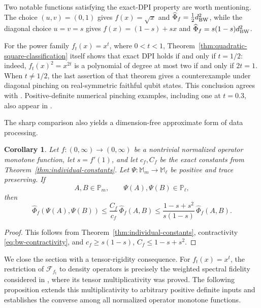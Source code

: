 \documentclass[11pt]{amsart}
\newtheorem{corollary}[theorem]{Corollary}
\theoremstyle{definition}
\theoremstyle{remark}
\newcommand{\altPhi}{\widehat{\Phi}}
\begin{document}
Two notable functions satisfying the exact-DPI property are worth
mentioning.  The
choice $(u,v)=(0,1)$ gives $f(x)=\sqrt{x}$ and
$\altPhi_f=\tfrac12d_{\rm BW}^2$, while the diagonal choice $u=v=s$
gives $f(x)=(1-s)+sx$ and
$\altPhi_f=s(1-s)d_{\rm BW}^2$.

For the power family $f_t(x)=x^t$, where $0<t<1$,
	Theorem~\ref{thm:quadratic-square-classification} itself shows that exact
	DPI holds if and only if $t=1/2$: indeed, $f_t(x)^2=x^{2t}$ is a
	polynomial of degree at most two if and only if $2t=1$.  When $t\ne1/2$,
	the last assertion of that theorem gives a counterexample under diagonal
	pinching on real-symmetric faithful qubit states.  This conclusion agrees
	with \cite[Theorem~5.4]{LeVuHoDinh2026}.
	Positive-definite numerical pinching examples, including one at
	$t=0.3$, also appear in \cite[Proposition~4.3]{VuongDinh2026}.

	The sharp comparison also yields a dimension-free approximate form of data
	processing.

	\begin{corollary}
		\label{cor:relaxed-dpi}
 Let $f:(0,\infty)\to(0,\infty)$ be a nontrivial normalized operator
	monotone function, let $s=f'(1)$, and let $c_f,C_f$ be the exact
	constants from Theorem~\ref{thm:individual-constants}.  Let
$\Psi:\mathbb M_m\to\mathbb M_\ell$ be positive and trace preserving.
If
\[
A,B\in\mathbb P_m,
\qquad
\Psi(A),\Psi(B)\in\mathbb P_\ell,
\]
then
		\begin{equation}\label{eq:relaxed-dpi}
			\altPhi_f(\Psi(A),\Psi(B))
			\le \frac{C_f}{c_f}\,\altPhi_f(A,B)
			\le \frac{1-s+s^2}{s(1-s)}\,\altPhi_f(A,B).
		\end{equation}
	\end{corollary}

	\begin{proof}
		This follows from Theorem~\ref{thm:individual-constants},
		contractivity \eqref{eq:bw-contractivity}, and
		$c_f\ge s(1-s)$, $C_f\le1-s+s^2$.
	\end{proof}

We close the section with a tensor-rigidity consequence.  For
$f_t(x)=x^t$, the restriction of $\mathcal F_{f_t}$ to density operators
is precisely the weighted spectral fidelity considered in
\cite[Proposition~3.4]{LeVuHoDinh2026}, where its tensor multiplicativity
was proved.  The following proposition extends this multiplicativity to
arbitrary positive definite inputs and establishes the converse among all
normalized operator monotone functions.
\end{document}

